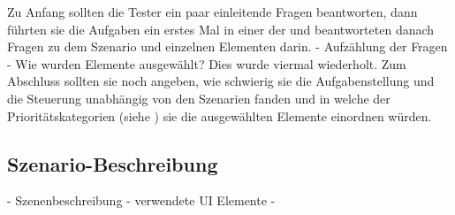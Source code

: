 			Zu Anfang sollten die Tester ein paar einleitende Fragen beantworten, dann führten sie die Aufgaben ein erstes Mal in einer der  und beantworteten danach Fragen zu dem Szenario und einzelnen Elementen darin.
			- Aufzählung der Fragen
			- Wie wurden Elemente ausgewählt?
			Dies wurde viermal wiederholt. Zum Abschluss sollten sie noch angeben, wie schwierig sie die Aufgabenstellung und die Steuerung unabhängig von den Szenarien fanden und in welche der Prioritätskategorien (siehe ) sie die ausgewählten Elemente einordnen würden.
		
		\subsection{Szenario-Beschreibung}
			- Szenenbeschreibung
			- verwendete UI Elemente
			- 
		
		